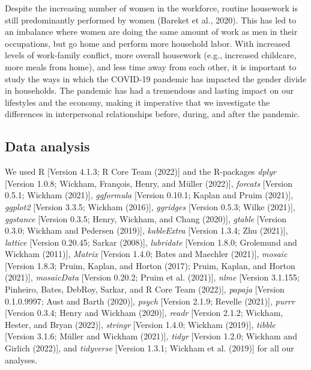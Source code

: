 \documentclass[
  man]{apa6}
\begin{document}
Despite the increasing number of women in the workforce, routine housework is still predominantly performed by women (Bareket et al., 2020). This has led to an imbalance where women are doing the same amount of work as men in their occupations, but go home and perform more household labor. With increased levels of work-family conflict, more overall housework (e.g., increased childcare, more meals from home), and less time away from each other, it is important to study the ways in which the COVID-19 pandemic has impacted the gender divide in households. The pandemic has had a tremendous and lasting impact on our lifestyles and the economy, making it imperative that we investigate the differences in interpersonal relationships before, during, and after the pandemic.

\newpage

\hypertarget{data-analysis}{%
\subsection{Data analysis}\label{data-analysis}}

We used R {[}Version 4.1.3; R Core Team (2022){]} and the R-packages \emph{dplyr} {[}Version 1.0.8; Wickham, François, Henry, and Müller (2022){]}, \emph{forcats} {[}Version 0.5.1; Wickham (2021){]}, \emph{ggformula} {[}Version 0.10.1; Kaplan and Pruim (2021){]}, \emph{ggplot2} {[}Version 3.3.5; Wickham (2016){]}, \emph{ggridges} {[}Version 0.5.3; Wilke (2021){]}, \emph{ggstance} {[}Version 0.3.5; Henry, Wickham, and Chang (2020){]}, \emph{gtable} {[}Version 0.3.0; Wickham and Pedersen (2019){]}, \emph{kableExtra} {[}Version 1.3.4; Zhu (2021){]}, \emph{lattice} {[}Version 0.20.45; Sarkar (2008){]}, \emph{lubridate} {[}Version 1.8.0; Grolemund and Wickham (2011){]}, \emph{Matrix} {[}Version 1.4.0; Bates and Maechler (2021){]}, \emph{mosaic} {[}Version 1.8.3; Pruim, Kaplan, and Horton (2017); Pruim, Kaplan, and Horton (2021){]}, \emph{mosaicData} {[}Version 0.20.2; Pruim et al. (2021){]}, \emph{nlme} {[}Version 3.1.155; Pinheiro, Bates, DebRoy, Sarkar, and R Core Team (2022){]}, \emph{papaja} {[}Version 0.1.0.9997; Aust and Barth (2020){]}, \emph{psych} {[}Version 2.1.9; Revelle (2021){]}, \emph{purrr} {[}Version 0.3.4; Henry and Wickham (2020){]}, \emph{readr} {[}Version 2.1.2; Wickham, Hester, and Bryan (2022){]}, \emph{stringr} {[}Version 1.4.0; Wickham (2019){]}, \emph{tibble} {[}Version 3.1.6; Müller and Wickham (2021){]}, \emph{tidyr} {[}Version 1.2.0; Wickham and Girlich (2022){]}, and \emph{tidyverse} {[}Version 1.3.1; Wickham et al. (2019){]} for all our analyses.
\end{document}
